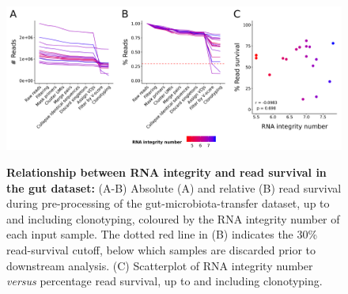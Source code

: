 \begin{figure}
\centering
\includegraphics[width = \textwidth]{_Figures/png/gut-read-survival-all-rin.png}
\begin{subfigure}{0em}
\label{fig:igseq-gut-read-survival-all-rin-abs}
\end{subfigure}
\begin{subfigure}{0em}
\label{fig:igseq-gut-read-survival-all-rin-rel}
\end{subfigure}
\begin{subfigure}{0em}
\label{fig:igseq-gut-read-survival-all-rin-scatter}
\end{subfigure}
\caption[Relationship between RNA integrity and read survival in the gut \igseq dataset]{\textbf{Relationship between RNA integrity and read survival in the gut \igseq dataset:} (A-B) Absolute (A) and relative (B) read survival during pre-processing of the \igseq gut-microbiota-transfer dataset, up to and including clonotyping, coloured by the RNA integrity number of each input sample. The dotted red line in (B) indicates the 30\% read-survival cutoff, below which samples are discarded prior to downstream analysis. (C) Scatterplot of RNA integrity number \textit{versus} percentage read survival, up to and including clonotyping.}
\label{fig:igseq-gut-read-survival-all-rin}
\end{figure}